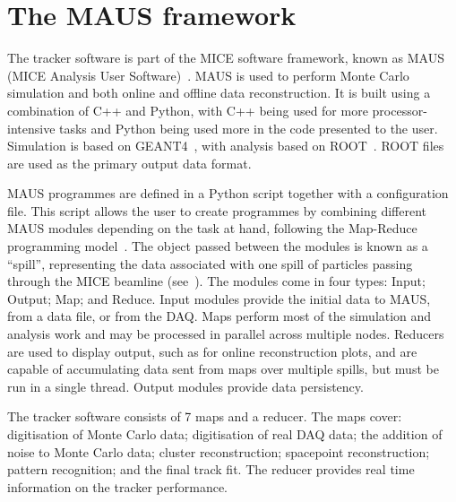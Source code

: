 \section{The MAUS framework}
\label{sec:MAUS}
The tracker software is part of the MICE software framework, known as MAUS (MICE Analysis User Software)~\cite{MausIPAC11}. MAUS is used to perform Monte Carlo simulation and both online and offline data reconstruction. It is built using a combination of C++ and Python, with C++ being used for more processor-intensive tasks and Python being used more in the code presented to the user.  Simulation is based on GEANT4~\cite{GEANT4}, with analysis based on ROOT~\cite{ROOT}.  ROOT files are used as the primary output data format. %

MAUS programmes are defined in a Python script together with a configuration file.  This script allows the user to create programmes by combining different MAUS modules depending on the task at hand, following the Map-Reduce programming model~\cite{MapReduce}. The object passed between the modules is known as a ``spill'', representing the data associated with one spill of particles passing through the MICE beamline (see~\cite{BeamlineJINST}).  The modules come in four types: Input; Output; Map; and Reduce.  Input modules provide the initial data to MAUS, from a data file, or from the DAQ. Maps perform most of the simulation and analysis work and may be processed in parallel across multiple nodes.  Reducers are used to display output, such as for online reconstruction plots, and are capable of accumulating data sent from maps over multiple spills, but must be run in a single thread. Output modules provide data persistency.

The tracker software consists of 7 maps and a reducer. The maps cover: digitisation of Monte Carlo data; digitisation of real DAQ data; the addition of noise to Monte Carlo data; cluster reconstruction; spacepoint reconstruction; pattern recognition; and the final track fit. The reducer provides real time information on the tracker performance.  %
